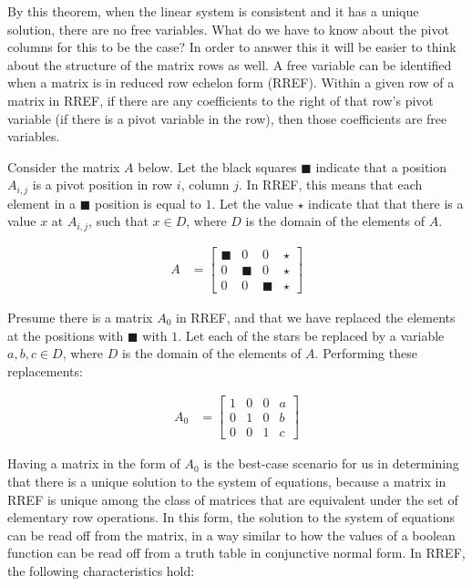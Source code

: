 \documentclass[10pt,letterpaper,final]{report}
\begin{document}
By this theorem, when the linear system is consistent and it has a unique solution, there are no free variables. What do we have to know about the pivot columns for this to be the case? In order to answer this it will be easier to think about the structure of the matrix rows as well. A free variable can be identified when a matrix is in reduced row echelon form (RREF). Within a given row of a matrix in RREF, if there are any coefficients to the right of that row's pivot variable (if there is a pivot variable in the row), then those coefficients are free variables.

Consider the matrix $A$ below. Let the black squares $\blacksquare$ indicate that a position $A_{i,j}$ is a pivot position in row $i$, column $j$. In RREF, this means that each element in a $\blacksquare$ position is equal to $1$. Let the value $\star$ indicate that that there is a value $x$ at $A_{i,j}$, such that $x \in D$, where $D$ is the domain of the elements of $A$.

\begin{align*}
  A & =
  \left[\begin{array}{rrr|r}
      \blacksquare & 0            & 0            & \star \\
      0            & \blacksquare & 0            & \star \\
      0            & 0            & \blacksquare & \star
    \end{array}\right]
\end{align*}

Presume there is a matrix $A_0$ in RREF, and that we have replaced the elements at the positions with $\blacksquare$ with $1$. Let each of the stars be replaced by a variable $a,b,c \in D$, where $D$ is the domain of the elements of $A$. Performing these replacements:

\begin{align*}
  A_0 & =
  \left[\begin{array}{rrr|r}
      1 & 0 & 0 & a \\
      0 & 1 & 0 & b \\
      0 & 0 & 1 & c
    \end{array}\right]
\end{align*}

Having a matrix in the form of $A_0$ is the best-case scenario for us in determining that there is a unique solution to the system of equations, because a matrix in RREF is unique among the class of matrices that are equivalent under the set of elementary row operations. In this form, the solution to the system of equations can be read off from the matrix, in a way similar to how the values of a boolean function can be read off from a truth table in conjunctive normal form. In RREF, the following characteristics hold:
\end{document}
